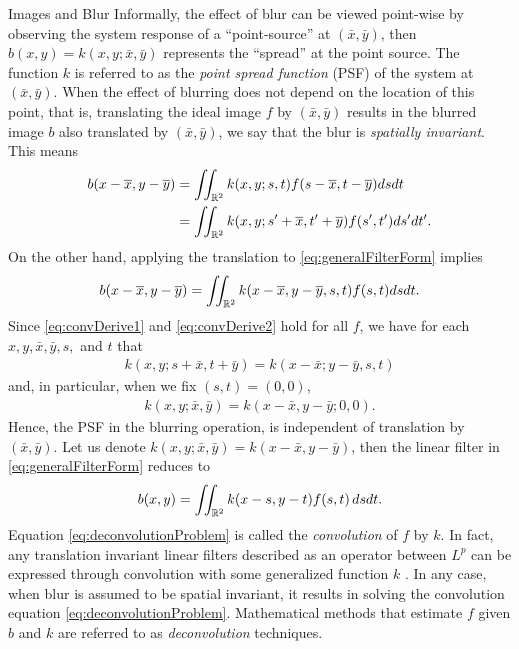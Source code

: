 \begin{chapter}{Images and Blur}
  Informally, the effect of blur can be viewed point-wise by observing the system response of a ``point-source'' at $(\bar x,\bar y)$, %
  then $b(x,y) = k(x,y;\bar x,\bar y)$ represents the ``spread'' at the point source.
  The function $k$ is referred to as the \emph{point spread function} (PSF) of the system at $(\bar x,\bar y)$.
  When the effect of blurring does not depend on the location of this point, that is, translating the ideal image $f$ by $(\bar x, \bar y)$ results in the blurred image $b$ also translated by $(\bar x,\bar y)$, we say that the blur is \emph{spatially invariant}. 
  This means
\begin{align} 
  b(x-\overline x,y-\overline y) 
  &= \iint_{\mathbb R^2} k(x,y;s,t) f(s-\overline x,t - \overline y)dsdt \nonumber\\
  &= \iint_{\mathbb R^2} k(x,y;s'+\overline x,t'+\overline y) f(s',t')ds'dt'.\label{eq:convDerive1}
\end{align}
  On the other hand, applying the translation to \eqref{eq:generalFilterForm} implies
\begin{equation} \label{eq:convDerive2}
  b(x-\overline x,y-\overline y) = \iint_{\mathbb R^2} k(x-\overline x,y-\overline y,s,t) f(s,t)dsdt. 
\end{equation}
  Since \eqref{eq:convDerive1} and \eqref{eq:convDerive2} hold for all $f$, we have for each $x,y,\bar x, \bar y,s,$ and $t$ that
\begin{align} 
 k(x,y;s+\bar x,t+\bar y) = k(x-\bar x;y-\bar y,s,t) 
\end{align}
  and, in particular, when we fix $(s,t) = (0,0)$,
\begin{align} 
 k(x,y;\bar x,\bar y) = k(x-\bar x,y-\bar y;0,0).
\end{align}
Hence, the PSF in the blurring operation, is independent of translation by $(\bar x,\bar y)$.
  Let us denote $k(x,y;\bar x,\bar y) = k(x-\bar x,y-\bar y)$, then the linear filter in \eqref{eq:generalFilterForm} reduces to   
\begin{equation}\label{eq:deconvolutionProblem}
  b(x,y) = \iint_{\mathbb R^2} k(x-s,y-t) f(s,t)\,dsdt.
\end{equation}
  Equation \eqref{eq:deconvolutionProblem} is called the \emph{convolution} of $f$ by $k$.
  In fact, any translation invariant linear filters described as an operator between $L^p$ can be expressed through convolution with some generalized function $k$ \citep{grafakos2014}.
  In any case, when blur is assumed to be spatial invariant, it results in solving the convolution equation \eqref{eq:deconvolutionProblem}.
  Mathematical methods that estimate $f$ given $b$ and $k$ are referred to as \emph{deconvolution} techniques.


\end{chapter}
